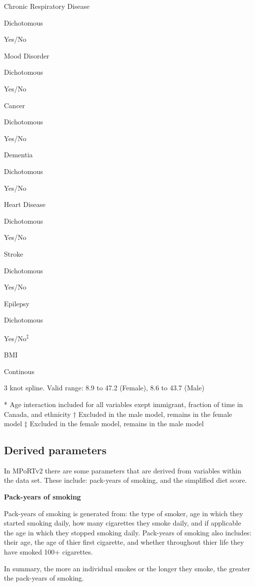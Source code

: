 \documentclass[]{book}
\begin{document}
Chronic Respiratory Disease

Dichotomous

Yes/No

Mood Disorder

Dichotomous

Yes/No

Cancer

Dichotomous

Yes/No

Dementia

Dichotomous

Yes/No

Heart Disease

Dichotomous

Yes/No

Stroke

Dichotomous

Yes/No

Epilepsy

Dichotomous

Yes/No\textsuperscript{‡}

BMI

Continous

3 knot spline. Valid range: 8.9 to 47.2 (Female), 8.6 to 43.7 (Male)

* Age interaction included for all variables exept immigrant, fraction
of time in Canada, and ethnicity † Excluded in the male model, remains
in the female model ‡ Excluded in the female model, remains in the male
model

\subsection{Derived parameters}\label{derived-parameters}

In MPoRTv2 there are some parameters that are derived from variables
within the data set. These include: pack-years of smoking, and the
simplified diet score.

\textbf{Pack-years of smoking}

Pack-years of smoking is generated from: the type of smoker, age in
which they started smoking daily, how many cigarettes they smoke daily,
and if applicable the age in which they stopped smoking daily.
Pack-years of smoking also includes: their age, the age of thier first
cigarette, and whether throughout thier life they have smoked 100+
cigarettes.

In summary, the more an individual smokes or the longer they smoke, the
greater the pack-years of smoking.
\end{document}
